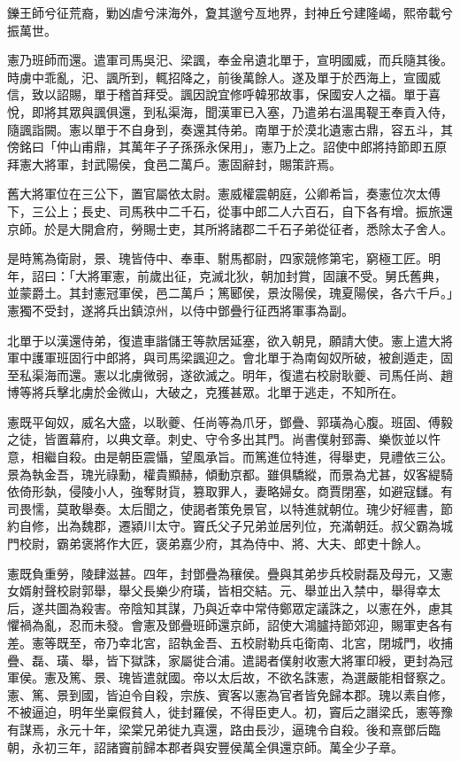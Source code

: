 \begin{pinyinscope}
鑠王師兮征荒裔，勦凶虐兮涞海外，夐其邈兮亙地界，封神丘兮建隆嵑，熙帝載兮振萬世。

憲乃班師而還。遣軍司馬吳汜、梁諷，奉金帛遺北單于，宣明國威，而兵隨其後。時虜中乖亂，汜、諷所到，輒招降之，前後萬餘人。遂及單于於西海上，宣國威信，致以詔賜，單于稽首拜受。諷因說宜修呼韓邪故事，保國安人之福。單于喜悅，即將其眾與諷俱還，到私渠海，聞漢軍已入塞，乃遣弟右溫禺鞮王奉貢入侍，隨諷詣闕。憲以單于不自身到，奏還其侍弟。南單于於漠北遺憲古鼎，容五斗，其傍銘曰「仲山甫鼎，其萬年子子孫孫永保用」，憲乃上之。詔使中郎將持節即五原拜憲大將軍，封武陽侯，食邑二萬戶。憲固辭封，賜策許焉。

舊大將軍位在三公下，置官屬依太尉。憲威權震朝庭，公卿希旨，奏憲位次太傅下，三公上；長史、司馬秩中二千石，從事中郎二人六百石，自下各有增。振旅還京師。於是大開倉府，勞賜士吏，其所將諸郡二千石子弟從征者，悉除太子舍人。

是時篤為衛尉，景、瑰皆侍中、奉車、駙馬都尉，四家競修第宅，窮極工匠。明年，詔曰：「大將軍憲，前歲出征，克滅北狄，朝加封賞，固讓不受。舅氏舊典，並蒙爵土。其封憲冠軍侯，邑二萬戶；篤郾侯，景汝陽侯，瑰夏陽侯，各六千戶。」憲獨不受封，遂將兵出鎮涼州，以侍中鄧疊行征西將軍事為副。

北單于以漢還侍弟，復遣車諧儲王等款居延塞，欲入朝見，願請大使。憲上遣大將軍中護軍班固行中郎將，與司馬梁諷迎之。會北單于為南匈奴所破，被創遁走，固至私渠海而還。憲以北虜微弱，遂欲滅之。明年，復遣右校尉耿夔、司馬任尚、趙博等將兵擊北虜於金微山，大破之，克獲甚眾。北單于逃走，不知所在。

憲既平匈奴，威名大盛，以耿夔、任尚等為爪牙，鄧疊、郭璜為心腹。班固、傅毅之徒，皆置幕府，以典文章。刺史、守令多出其門。尚書僕射郅壽、樂恢並以忤意，相繼自殺。由是朝臣震懾，望風承旨。而篤進位特進，得舉吏，見禮依三公。景為執金吾，瑰光祿勳，權貴顯赫，傾動京都。雖俱驕縱，而景為尤甚，奴客緹騎依倚形埶，侵陵小人，強奪財貨，篡取罪人，妻略婦女。商賈閉塞，如避寇讎。有司畏懦，莫敢舉奏。太后聞之，使謁者策免景官，以特進就朝位。瑰少好經書，節約自修，出為魏郡，遷潁川太守。竇氏父子兄弟並居列位，充滿朝廷。叔父霸為城門校尉，霸弟褒將作大匠，褒弟嘉少府，其為侍中、將、大夫、郎吏十餘人。

憲既負重勞，陵肆滋甚。四年，封鄧疊為穰侯。疊與其弟步兵校尉磊及母元，又憲女婿射聲校尉郭舉，舉父長樂少府璜，皆相交結。元、舉並出入禁中，舉得幸太后，遂共圖為殺害。帝陰知其謀，乃與近幸中常侍鄭眾定議誅之，以憲在外，慮其懼禍為亂，忍而未發。會憲及鄧疊班師還京師，詔使大鴻臚持節郊迎，賜軍吏各有差。憲等既至，帝乃幸北宮，詔執金吾、五校尉勒兵屯衛南、北宮，閉城門，收捕疊、磊、璜、舉，皆下獄誅，家屬徙合浦。遣謁者僕射收憲大將軍印綬，更封為冠軍侯。憲及篤、景、瑰皆遣就國。帝以太后故，不欲名誅憲，為選嚴能相督察之。憲、篤、景到國，皆迫令自殺，宗族、賓客以憲為官者皆免歸本郡。瑰以素自修，不被逼迫，明年坐稟假貧人，徙封羅侯，不得臣吏人。初，竇后之譖梁氏，憲等豫有謀焉，永元十年，梁棠兄弟徙九真還，路由長沙，逼瑰令自殺。後和熹鄧后臨朝，永初三年，詔諸竇前歸本郡者與安豐侯萬全俱還京師。萬全少子章。


\end{pinyinscope}
